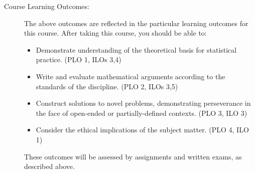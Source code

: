 \documentclass[
  twoside]{article}
\begin{document}
\begin{description}
\item[Course Learning Outcomes:] The above outcomes are reflected in the
     particular learning outcomes for this course.
     After taking this course, you should be able
     to:
    \begin{itemize}
        \item Demonstrate understanding of the theoretical basis for statistical practice.
             (PLO 1, ILOs 3,4)
        \item Write and evaluate mathematical arguments according to the
             standards of the discipline. (PLO 2,
              ILOs 3,5)
        \item Construct solutions to novel problems,
               demonstrating perseverance in the face of open-ended or
               partially-defined contexts. (PLO 3, ILO 3)
        \item Consider the ethical implications of the subject matter. (PLO 4, ILO 1)
    \end{itemize}
These outcomes will be assessed by assignments and written exams, as described above.

\end{description}
\end{document}
